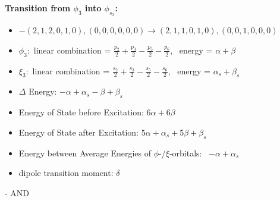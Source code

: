 \documentclass[12pt,a4paper]{article}
\begin{document}
        \noindent\textbf{Transition from $\phi_{3}$ into $\phi_{s_{3}}$:}
        \begin{itemize}
            \item $- (2, 1, 2, 0, 1, 0), (0, 0, 0, 0, 0, 0) \rightarrow (2, 1, 1, 0, 1, 0), (0, 0, 1, 0, 0, 0)$
        
            \item $\phi_{3}:$ linear combination = $\frac{p_{2}}{2} + \frac{p_{3}}{2} - \frac{p_{5}}{2} - \frac{p_{6}}{2}$, \
            energy = $\alpha + \beta$
            
            \item $\xi_{3}:$ linear combination = $\frac{s_{2}}{2} + \frac{s_{3}}{2} - \frac{s_{5}}{2} - \frac{s_{6}}{2}$, \
            energy = $\alpha_{s} + \beta_{s}$
            
            \item $\Delta$ Energy: $- \alpha + \alpha_{s} - \beta + \beta_{s}$
            \item Energy of State before Excitation: $6 \alpha + 6 \beta$
            \item Energy of State after Excitation: $5 \alpha + \alpha_{s} + 5 \beta + \beta_{s}$
            \item Energy between Average Energies of $\phi$-/$\xi$-orbitals: \
            $- \alpha + \alpha_{s}$
        
            \item dipole transition moment: $\delta$
        
        \end{itemize}
        
 -  AND 
\end{document}
